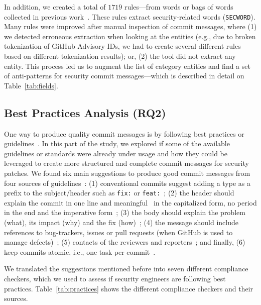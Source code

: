 In  addition, we created a total of $1719$
rules---from words or 
bags of words collected in previous 
work~\cite{10.1145/3133956.3134072,10.1145/3475716.3475781}.  These rules extract security-related words (\texttt{SECWORD}). Many rules were improved after manual 
inspection of commit messages, where (1) we detected erroneous 
extraction when looking at the entities (e.g., due to broken 
tokenization of GitHub Advisory IDs, we had to create several 
different rules based on different tokenization results); or, 
(2) the tool did not extract any entity. This process led us to 
augment the list of category entities and find a set of 
anti-patterns for security commit messages---which is described in detail on Table~\ref{tab:fields}. 


\subsection{Best Practices Analysis (RQ2)}

One way to produce quality 
commit messages is by following best practices or guidelines~\cite{Tian_2022, convcom,linus,atomic}. 
In this part of the study, we explored if some of the available guidelines or standards 
were already under usage and how they could be leveraged to create more structured and complete commit messages for security patches.
We found six main suggestions to produce good commit messages from four sources of guidelines~\cite{convcom,goodcommit,linus,Tian_2022}: (1) conventional commits suggest adding a type as a prefix to the subject/header such as \texttt{fix:} or  \texttt{feat:}~\cite{convcom}; (2) the header should explain the commit in one line and meaningful~\cite{convcom,goodcommit} in the capitalized form, no period in the end and the imperative form~\cite{goodcommit}; (3) the body should explain the problem (what), its impact (why) and the fix (how)~\cite{linus,Tian_2022}; (4) the message should include references to bug-trackers, issues or pull requests (when GitHub is used to manage defects)~\cite{goodcommit}; (5) contacts of the reviewers and reporters~\cite{linus}; and finally, (6) keep commits atomic, i.e., one task per commit~\cite{goodcommit}.

We translated the suggestions mentioned before into seven different compliance checkers, which we used to assess if security engineers are following best practices. Table~\ref{tab:practices} shows the different compliance checkers and their sources. %



